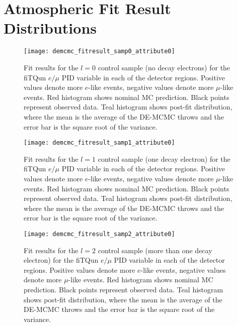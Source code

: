 \section{Atmospheric Fit Result Distributions}
\label{sec:fithistos}


\begin{figure}[h]
  \begin{center}
    \texttt{[image: demcmc\_fitresult\_samp0\_attribute0]} 
  \end{center}
  \caption{Fit results for the $l=0$ control sample (no decay electrons) for
  the fiTQun $e/\mu$ PID variable in each of the detector regions.  Positive
  values denote more $e$-like events, negative values denote more $\mu$-like
  events.  Red histogram shows nominal MC prediction.  Black points represent
  observed data.  Teal histogram shows post-fit distribution, where the mean is
  the average of the DE-MCMC throws and the error bar is the square root of the
  variance.}
  \label{fig:fitresults_samp0_att0}
\end{figure}


\begin{figure}[h]
  \begin{center}
    \texttt{[image: demcmc\_fitresult\_samp1\_attribute0]} 
  \end{center}
  \caption{Fit results for the $l=1$ control sample (one decay electron) for
  the fiTQun $e/\mu$ PID variable in each of the detector regions.  Positive
  values denote more $e$-like events, negative values denote more $\mu$-like
  events.  Red histogram shows nominal MC prediction.  Black points represent
  observed data.  Teal histogram shows post-fit distribution, where the mean is
  the average of the DE-MCMC throws and the error bar is the square root of the
  variance.}
  \label{fig:fitresults_samp1_att0}
\end{figure}


\begin{figure}[h]
  \begin{center}
    \texttt{[image: demcmc\_fitresult\_samp2\_attribute0]} 
  \end{center}
  \caption{Fit results for the $l=2$ control sample (more than one decay
  electron) for the fiTQun $e/\mu$ PID variable in each of the detector
  regions.  Positive values denote more $e$-like events, negative values denote
  more $\mu$-like events. Red histogram shows nominal MC prediction.  Black
  points represent observed data.  Teal histogram shows post-fit distribution,
  where the mean is the average of the DE-MCMC throws and the error bar is the
  square root of the variance.}
  \label{fig:fitresults_samp2_att0}
\end{figure}


